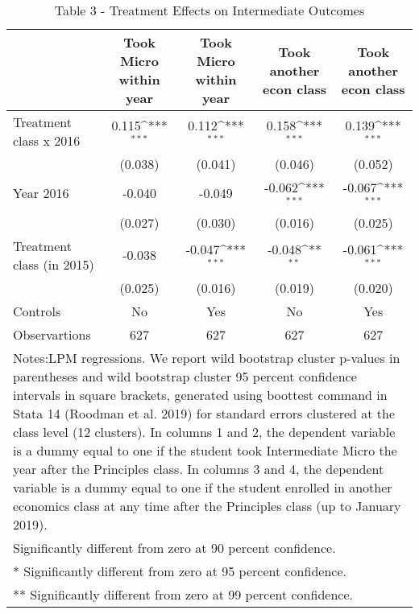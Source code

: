 \begin{table}[]
\caption{Table 3 - Treatment Effects on Intermediate Outcomes}
{
\def\sym#1{\ifmmode^{#1}\else\(^{#1}\)\fi}
\begin{tabular}{@{\extracolsep{2pt}}l*{4}{c}@{}}
\hline\hline


 & Took Micro within year & Took Micro within year & Took another econ class & Took another econ class \\
\hline
Treatment class x 2016 & 0.115\sym{***} & 0.112\sym{***} & 0.158\sym{***} & 0.139\sym{***} \\
 & (0.038) & (0.041) & (0.046) & (0.052) \\
Year 2016 & -0.040 & -0.049 & -0.062\sym{***} & -0.067\sym{***} \\
 & (0.027) & (0.030) & (0.016) & (0.025) \\
Treatment class (in 2015) & -0.038 & -0.047\sym{***} & -0.048\sym{**} & -0.061\sym{***} \\
 & (0.025) & (0.016) & (0.019) & (0.020) \\
Controls & No & Yes & No & Yes \\

\hline
Observartions & 627 & 627 & 627 & 627 \\
\hline\hline
\multicolumn{5}{l}{\footnotesize Notes:LPM regressions. We report wild bootstrap cluster p-values in parentheses and wild bootstrap cluster 95                percent confidence intervals in square brackets, generated using boottest command in Stata 14 (Roodman et al.                2019) for standard errors clustered at the class level (12 clusters). In columns 1 and 2, the dependent variable is a                dummy equal to one if the student took Intermediate Micro the year after the Principles class. In columns 3 and 4,                the dependent variable is a dummy equal to one if the student enrolled in another economics class at any time after                the Principles class (up to January 2019).}\vspace{-.25em} \\
\multicolumn{5}{l}{\footnotesize * Significantly different from zero at 90 percent confidence.}\vspace{-.25em} \\
\multicolumn{5}{l}{\footnotesize ** Significantly different from zero at 95 percent confidence.}\vspace{-.25em} \\
\multicolumn{5}{l}{\footnotesize *** Significantly different from zero at 99 percent confidence.}
\end{tabular}
}
\end{table}